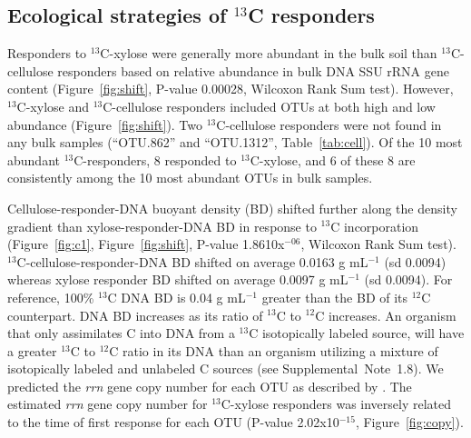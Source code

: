 \subsection{Ecological strategies of $^{13}$C responders}
Responders to $^{13}$C-xylose were generally more abundant in the bulk soil
than $^{13}$C-cellulose responders based on relative abundance in bulk DNA SSU
rRNA gene content (Figure~\ref{fig:shift}, P-value 0.00028, Wilcoxon Rank Sum
test). However, $^{13}$C-xylose and $^{13}$C-cellulose responders included OTUs
at both high and low abundance (Figure~\ref{fig:shift}). Two $^{13}$C-cellulose
responders were not found in any bulk samples (``OTU.862'' and ``OTU.1312'',
Table~\ref{tab:cell}). Of the 10 most abundant $^{13}$C-responders, 8 responded
to $^{13}$C-xylose, and 6 of these 8 are consistently among the
10 most abundant OTUs in bulk samples.

Cellulose-responder-DNA buoyant density (BD) shifted further along the density
gradient than xylose-responder-DNA BD in response to $^{13}$C incorporation
(Figure~\ref{fig:c1}, Figure~\ref{fig:shift}, P-value 1.8610x$^{-06}$, Wilcoxon
Rank Sum test). $^{13}$C-cellulose-responder-DNA BD shifted on average
0.0163 g mL$^{-1}$ (sd 0.0094) whereas xylose responder BD shifted on average
0.0097 g mL$^{-1}$ (sd 0.0094). For reference, 100\% $^{13}$C DNA BD is 0.04
g mL$^{-1}$ greater than the BD of its $^{12}$C counterpart. DNA BD increases
as its ratio of $^{13}$C to $^{12}$C increases. An organism that only
assimilates C into DNA from a $^{13}$C isotopically labeled source, will have
a greater $^{13}$C to $^{12}$C ratio in its DNA than an organism utilizing
a mixture of isotopically labeled and unlabeled C sources (see
Supplemental~Note~1.8). We predicted the \textit{rrn} gene copy number for each
OTU as described by \citet{Kembel_2012}. The estimated \textit{rrn} gene copy
number for $^{13}$C-xylose responders was inversely related to the time of
first response for each OTU (P-value 2.02x10$^{-15}$, Figure~\ref{fig:copy}).


